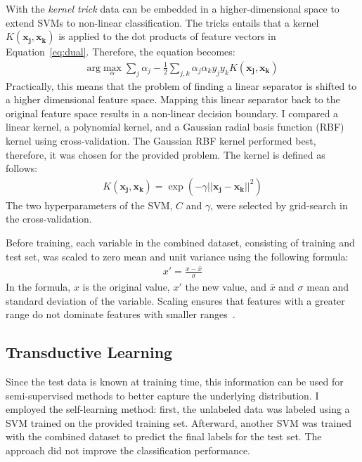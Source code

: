 \documentclass[a4paper,11pt]{article}
\begin{document}
With the \emph{kernel trick} data can be embedded in a
higher-dimensional space to extend SVMs to non-linear
classification. The tricks entails that a kernel
$K(\mathbf{x_j}, \mathbf{x_k})$ is applied to the dot products of
feature vectors in Equation~\ref{eq:dual}. Therefore, the equation
becomes:
\begin{align}
\label{eq:dualkernel}
  \text{arg}\max_\alpha\sum_j\alpha_j - \frac{1}{2}\sum_{j,k}\alpha_j\alpha_ky_jy_kK(\mathbf{x_j}, \mathbf{x_k})
\end{align} 
Practically, this means that the problem of finding a linear separator
is shifted to a higher dimensional feature space. Mapping this linear
separator back to the original feature space results in a non-linear
decision boundary.  I compared a linear kernel, a polynomial kernel,
and a Gaussian radial basis function (RBF) kernel using
cross-validation. The Gaussian RBF kernel performed best, therefore,
it was chosen for the provided problem. The kernel is defined as follows:
\begin{align}
K(\mathbf{x_j}, \mathbf{x_k}) = \exp(-\gamma||\mathbf{x_j} - \mathbf{x_k} ||^2)
\end{align}
The two hyperparameters of the SVM, $C$ and $\gamma$, were selected by
grid-search in the cross-validation.


Before training, each variable in the combined dataset, consisting of
training and test set, was scaled to zero mean and unit variance using
the following formula:
\begin{align}
  x' = \frac{x - \bar{x}}{\sigma}
\end{align}
In the formula, $x$ is the original value, $x'$ the new value, and
$\bar{x}$ and $\sigma$ mean and standard deviation of the
variable. Scaling ensures that features with a greater range do not
dominate features with smaller ranges~\cite{hsu2003practical}.

\subsection{Transductive Learning}

Since the test data is known at training time, this information can be
used for semi-supervised methods to better capture the underlying
distribution. I employed the self-learning method: first, the
unlabeled data was labeled using a SVM trained on the provided
training set. Afterward, another SVM was trained with the combined
dataset to predict the final labels for the test set. The approach did
not improve the classification performance.
\end{document}

